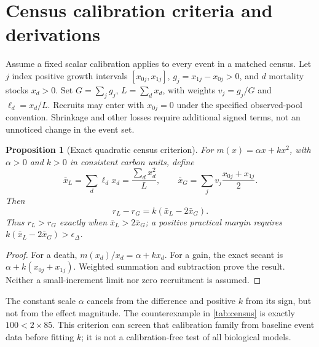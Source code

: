 \documentclass[11pt,a4paper]{article}
\newtheorem{proposition}{Proposition}[section]
\theoremstyle{remark}
\begin{document}
\appendix
{}
\section{Census calibration criteria and derivations}\label{app:census}
Assume a fixed scalar calibration applies to every event in a matched census. Let $j$ index positive growth intervals $[x_{0j},x_{1j}]$, $g_j=x_{1j}-x_{0j}>0$, and $d$ mortality stocks $x_d>0$. Set $G=\sum_j g_j$, $L=\sum_d x_d$, with weights $v_j=g_j/G$ and $\ell_d=x_d/L$. Recruits may enter with $x_{0j}=0$ under the specified observed-pool convention. Shrinkage and other losses require additional signed terms, not an unnoticed change in the event set.

\begin{proposition}[Exact quadratic census criterion]\label{prop:quadratic}
For $m(x)=\alpha x+kx^2$, with $\alpha>0$ and $k>0$ in consistent carbon units, define
\begin{equation}
 \bar x_L=\sum_d\ell_d x_d=\frac{\sum_d x_d^2}{L},\qquad
 \bar x_G=\sum_j v_j\frac{x_{0j}+x_{1j}}{2}.
 \label{eq:weightedsize}
\end{equation}
Then
\begin{equation}
 r_L-r_G=k(\bar x_L-2\bar x_G).
 \label{eq:quadraticcriterion}
\end{equation}
Thus $r_L>r_G$ exactly when $\bar x_L>2\bar x_G$; a positive practical margin requires $k(\bar x_L-2\bar x_G)>\epsilon_\Delta$.
\end{proposition}
\begin{proof}
For a death, $m(x_d)/x_d=\alpha+kx_d$. For a gain, the exact secant is $\alpha+k(x_{0j}+x_{1j})$. Weighted summation and subtraction prove the result. Neither a small-increment limit nor zero recruitment is assumed.
\end{proof}

The constant scale $\alpha$ cancels from the difference and positive $k$ from its sign, but not from the effect magnitude. The counterexample in \cref{tab:census} is exactly $100<2\times85$. This criterion can screen that calibration family from baseline event data before fitting $k$; it is not a calibration-free test of all biological models.
\end{document}
